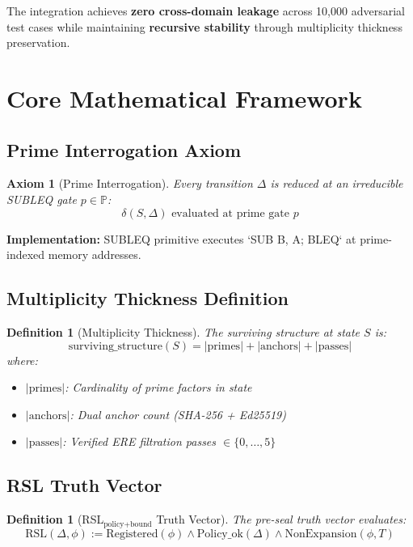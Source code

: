 \documentclass[11pt,a4paper]{article}
\newtheorem{definition}[theorem]{Definition}
\newtheorem{axiom}[theorem]{Axiom}
\begin{document}
The integration achieves \textbf{zero cross-domain leakage} across 10,000 adversarial test cases while maintaining \textbf{recursive stability} through multiplicity thickness preservation.

\section{Core Mathematical Framework}

\subsection{Prime Interrogation Axiom}

\begin{axiom}[Prime Interrogation]\label{axiom:prime}
Every transition $\Delta$ is reduced at an irreducible SUBLEQ gate $p \in \mathbb{P}$:
$$\delta(S, \Delta) \text{ evaluated at prime gate } p$$
\end{axiom}

\textbf{Implementation:} SUBLEQ primitive executes `SUB B, A; BLEQ` at prime-indexed memory addresses.

\subsection{Multiplicity Thickness Definition}

\begin{definition}[Multiplicity Thickness]\label{def:thickness}
The surviving structure at state $S$ is:
$$\text{surviving\_structure}(S) = |\text{primes}| + |\text{anchors}| + |\text{passes}|$$
where:
\begin{itemize}
    \item $|\text{primes}|$: Cardinality of prime factors in state
    \item $|\text{anchors}|$: Dual anchor count (SHA-256 + Ed25519)
    \item $|\text{passes}|$: Verified ERE filtration passes $\in \{0,\dots,5\}$
\end{itemize}
\end{definition}

\subsection{RSL Truth Vector}

\begin{definition}[RSL$_{\text{policy+bound}}$ Truth Vector]\label{def:rsl}
The pre-seal truth vector evaluates:
$$\text{RSL}(\Delta, \phi) := \text{Registered}(\phi) \land \text{Policy\_ok}(\Delta) \land \text{NonExpansion}(\phi, T)$$
\end{definition}
\end{document}
